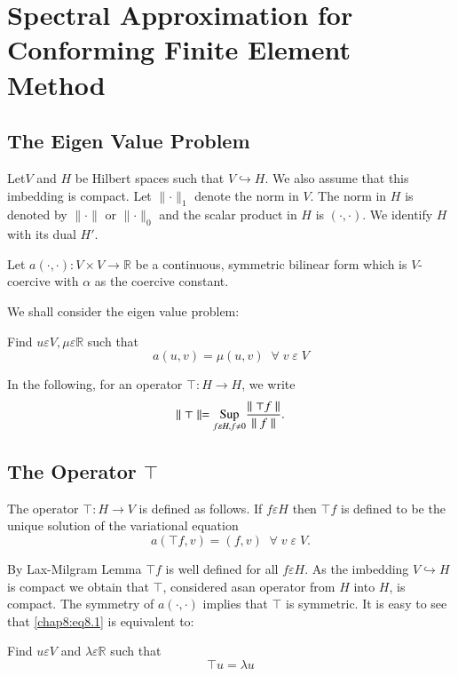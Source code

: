 
\chapter[Spectral Approximation for Conforming Finite...]{Spectral
  Approximation for Conforming Finite Element 
  Method}\label{chap8} 

\section{The Eigen Value Problem} \label{chap8:sec1}
Let\pageoriginale $V$ and $H$ be Hilbert spaces such that
$V\hookrightarrow H$. We also assume that this imbedding is
compact. Let $\parallel\cdotp\parallel_1$ denote the norm in $V$. The
norm in $H$ is denoted by $\parallel\cdotp\parallel$ or $\parallel
\cdotp\parallel_0$ and the scalar product in $H$ is
$(\cdotp,\cdotp)$. We identify $H$ with its dual $H'$.

Let $a(\cdotp,\cdotp):V\times V\to \mathbb{R}$ be a continuous,
symmetric bilinear form which is $V$-coercive with $\alpha$ as the
coercive constant.

We shall consider the eigen value problem:

Find $u\varepsilon V,\mu\varepsilon \mathbb{R}$ such that 
\begin{equation}\label{chap8:eq8.1}
a(u,v)=\mu(u,v)\; \; \forall \;v \;\varepsilon \;V
\end{equation}

In the following, for an operator $\top: H\to H$, we write 
$$
\parallel\top\parallel=\underset{f\varepsilon H,f\neq 0}{\operatorname{Sup}}
\frac{\parallel\top f\parallel}{\parallel f\parallel}.
$$

\section{The Operator $\top$} \label{chap8:sec2} 
The
operator $\top :H\to V$ is defined as follows. If $f\varepsilon H$
then $\top f$ is defined to be the unique solution of the variational
equation 
$$
a(\top f,v)=(f,v)\; \; \forall \;v \;\varepsilon \;V.
$$

By Lax-Milgram Lemma $\top f$ is well defined for all $f\varepsilon
H$. As the imbedding $V\hookrightarrow H$ is compact we obtain that
$\top$, considered as\pageoriginale an operator from $H$ into $H$, is
compact. The symmetry of $a(\cdotp,\cdotp)$ implies that $\top$ is
symmetric. It is easy to see that \eqref{chap8:eq8.1} is equivalent
to:

Find $u\varepsilon V$ and $\lambda \varepsilon \mathbb{R}$ such that
\begin{equation}\label{chap8:eq8.2}
\top u=\lambda u
\end{equation}

